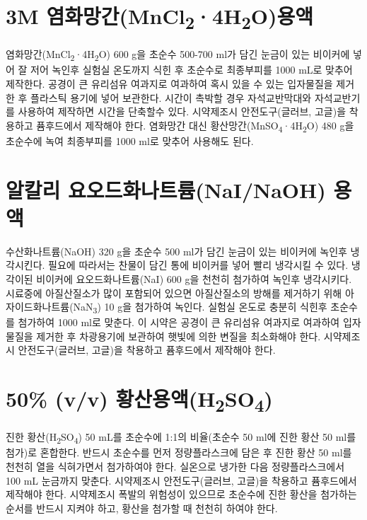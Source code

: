 \documentclass[
]{book}
\begin{document}
\hypertarget{m-uxc5fcuxd654uxb9dduxac04mncl24h2ouxc6a9uxc561}{%
\section{\texorpdfstring{3M 염화망간(MnCl\textsubscript{2}·4H\textsubscript{2}O)용액}{3M 염화망간(MnCl2·4H2O)용액}}\label{m-uxc5fcuxd654uxb9dduxac04mncl24h2ouxc6a9uxc561}}

염화망간(MnCl\textsubscript{2}·4H\textsubscript{2}O) 600 g을 초순수 500-700 ml가 담긴 눈금이 있는 비이커에 넣어 잘 저어 녹인후 실험실 온도까지 식힌 후 초순수로 최종부피를 1000 mL로 맞추어 제작한다. 공경이 큰 유리섬유 여과지로 여과하여 혹시 있을 수 있는 입자물질을 제거한 후 플라스틱 용기에 넣어 보관한다. 시간이 촉박할 경우 자석교반막대와 자석교반기를 사용하여 제작하면 시간을 단축할수 있다. 시약제조시 안전도구(글러브, 고글)을 착용하고 퓸후드에서 제작해야 한다. 염화망간 대신 황산망간(MnSO\textsubscript{4}·4H\textsubscript{2}O) 480 g을 초순수에 녹여 최종부피를 1000 ml로 맞추어 사용해도 된다.

\hypertarget{uxc54cuxce7cuxb9ac-uxc694uxc624uxb4dcuxd654uxb098uxd2b8uxb968nainaoh-uxc6a9uxc561}{%
\section{알칼리 요오드화나트륨(NaI/NaOH) 용액}\label{uxc54cuxce7cuxb9ac-uxc694uxc624uxb4dcuxd654uxb098uxd2b8uxb968nainaoh-uxc6a9uxc561}}

수산화나트륨(NaOH) 320 g을 초순수 500 ml가 담긴 눈금이 있는 비이커에 녹인후 냉각시킨다. 필요에 따라서는 찬물이 담긴 통에 비이커를 넣어 빨리 냉각시킬 수 있다. 냉각이된 비이커에 요오드화나트륨(NaI) 600 g을 천천히 첨가하여 녹인후 냉각시키다. 시료중에 아질산질소가 많이 포함되어 있으면 아질산질소의 방해를 제거하기 위해 아자이드화나트륨(NaN\textsubscript{3}) 10 g을 첨가하여 녹인다. 실험실 온도로 충분히 식힌후 초순수를 첨가하여 1000 ml로 맞춘다. 이 시약은 공경이 큰 유리섬유 여과지로 여과하여 입자물질을 제거한 후 차광용기에 보관하여 햇빛에 의한 변질을 최소화해야 한다. 시약제조시 안전도구(글러브, 고글)을 착용하고 퓸후드에서 제작해야 한다.

\hypertarget{vv-uxd669uxc0b0uxc6a9uxc561h2so4}{%
\section{\texorpdfstring{50\% (v/v) 황산용액(H\textsubscript{2}SO\textsubscript{4})}{50\% (v/v) 황산용액(H2SO4)}}\label{vv-uxd669uxc0b0uxc6a9uxc561h2so4}}

진한 황산(H\textsubscript{2}SO\textsubscript{4}) 50 mL를 초순수에 1:1의 비율(초순수 50 ml에 진한 황산 50 ml를 첨가)로 혼합한다. 반드시 초순수를 먼저 정량플라스크에 담은 후 진한 황산 50 ml를 천천히 열을 식혀가면서 첨가하여야 한다. 실온으로 냉가한 다음 정량플라스크에서 100 mL 눈금까지 맞춘다. 시약제조시 안전도구(글러브, 고글)을 착용하고 퓸후드에서 제작해야 한다. 시약제조시 폭발의 위험성이 있으므로 초순수에 진한 황산을 첨가하는 순서를 반드시 지켜야 하고, 황산을 첨가할 때 천천히 하여야 한다.
\end{document}
